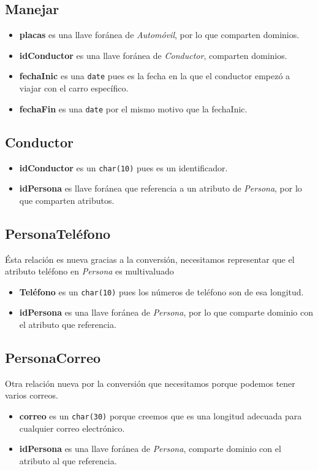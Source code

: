 \documentclass[11pt]{article}
\begin{document}
\subsection*{Manejar}
\label{sec:org532cd8d}
\begin{itemize}
\item \textbf{placas} es una llave foránea de \emph{Automóvil}, por lo que comparten dominios.
\item \textbf{idConductor} es una llave foránea de \emph{Conductor}, comparten dominios.
\item \textbf{fechaInic} es una \texttt{date} pues es la fecha en la que el conductor empezó a viajar con el carro específico.
\item \textbf{fechaFin} es una \texttt{date} por el mismo motivo que la fechaInic.
\end{itemize}
\subsection*{Conductor}
\label{sec:org20d51d3}
\begin{itemize}
\item \textbf{idConductor} es un \texttt{char(10)} pues es un identificador.
\item \textbf{idPersona} es llave foránea que referencia a un atributo de \emph{Persona}, por lo que comparten atributos.
\end{itemize}
\subsection*{PersonaTeléfono}
\label{sec:org687c26c}
Ésta relación es nueva gracias a la conversión, necesitamos representar que el atributo teléfono en \emph{Persona} es
multivaluado
\begin{itemize}
\item \textbf{Teléfono} es un \texttt{char(10)} pues los números de teléfono son de esa longitud.
\item \textbf{idPersona} es una llave foránea de \emph{Persona}, por lo que comparte dominio con el atributo que referencia.
\end{itemize}
\subsection*{PersonaCorreo}
\label{sec:org888d119}
Otra relación nueva por la conversión que necesitamos porque podemos tener varios correos.
\begin{itemize}
\item \textbf{correo} es un \texttt{char(30)} porque creemos que es una longitud adecuada para cualquier correo electrónico.
\item \textbf{idPersona} es una llave foránea de \emph{Persona}, comparte dominio con el atributo al que referencia.
\end{itemize}
\end{document}
